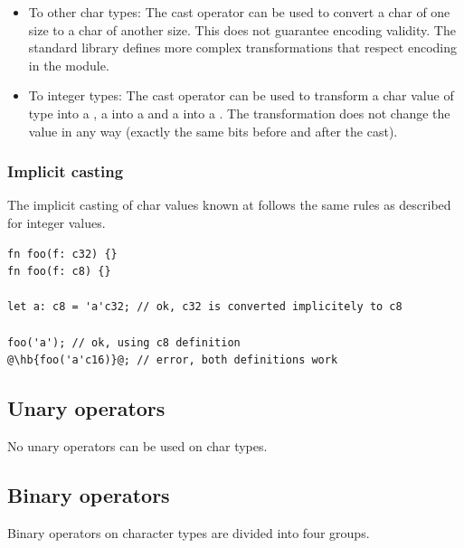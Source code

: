 \begin{itemize}
  \setlength\itemsep{-4pt}
\item To other char types: The cast operator can be used to convert a char of
  one size to a char of another size. This does not guarantee encoding validity.
  The standard library defines more complex transformations that respect
  encoding in the  module.

\item To integer types: The cast operator can be used to transform a char value
  of type  into a , a  into a  and
  a  into a . The transformation does not change the
  value in any way (exactly the same bits before and after the cast).

\end{itemize}


\subsubsection{Implicit casting}

The implicit casting of char values known at  follows the same
rules as described for integer  values.

\begin{lstlisting}[style=coloredverbatim, escapechar=@]
fn foo(f: c32) {}
fn foo(f: c8) {}

let a: c8 = 'a'c32; // ok, c32 is converted implicitely to c8

foo('a'); // ok, using c8 definition
@\hb{foo('a'c16)}@; // error, both definitions work
\end{lstlisting}

\subsection{Unary operators}
\label{sec:org78546fb}

No unary operators can be used on char types.

\subsection{Binary operators}
\label{sec:orge863f7d}

Binary operators on character types are divided into four groups.


